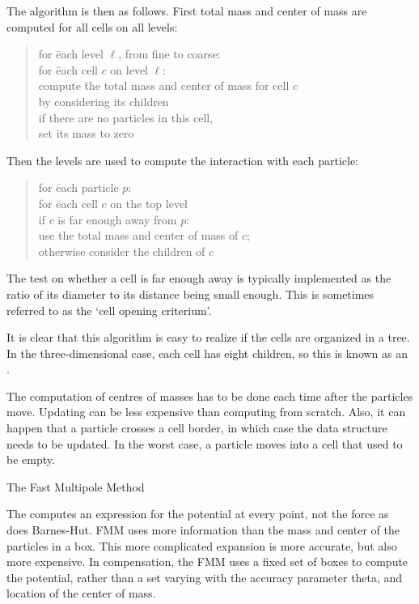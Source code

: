 The algorithm is then as follows. First total mass and center of mass
are computed for all cells on all levels:
\begin{quotation}
  \begin{tabbing}
    for \=each level $\ell$, from fine to coarse:\\
    \>for \=each cell $c$ on level $\ell$:\\
    \>\> compute \=the total mass and center of mass for cell $c$\\
    \>\>\> by considering its children\\
    \> if there are no particles in this cell,\\
    \>\> set its mass to zero
  \end{tabbing}
\end{quotation}
Then the levels are used to compute the interaction with each particle:
\begin{quotation}
  \begin{tabbing}
    for \=each particle $p$:\\
    \>for \=each cell $c$ on the top level\\
    \>\>if $c$ \=is far enough away from $p$:\\
    \>\>\>use the total mass and center of mass of $c$;\\
    \>\>otherwise consider the children of $c$
  \end{tabbing}
\end{quotation}
The test on whether a cell is far enough away is typically implemented
as the ratio of its diameter to its distance being small enough. This
is sometimes referred to as the `cell opening criterium'.

It is clear that this algorithm is easy to realize if the cells are
organized in a tree. In the three-dimensional case, each cell has
eight children, so this is known as an .

The computation of centres of masses has to be done each time after
the particles move. Updating can be less expensive than computing from
scratch. Also, it can happen that a particle crosses a cell border, in
which case the data structure needs to be updated. In the worst case,
a particle moves into a cell that used to be empty.


 {The Fast Multipole Method}

The  computes an expression for the potential at every point,
not the force as does Barnes-Hut.  \ac{FMM} uses more information than the
mass and center of the particles in a box. This more complicated
expansion is more accurate, but also more expensive. In compensation,
the FMM uses a fixed set of boxes to compute the potential, rather
than a set varying with the accuracy parameter theta, and location of
the center of mass.

